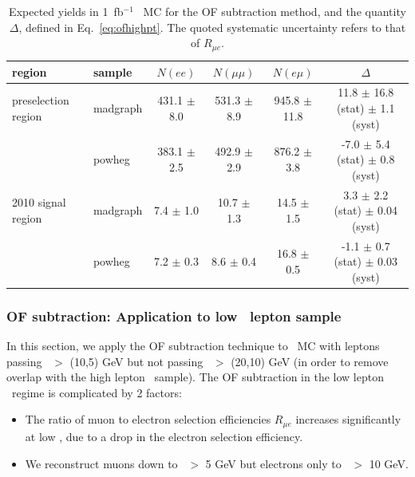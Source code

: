 \begin{table}[hbt]
\begin{center}
\caption{\label{tab:mcof} Expected yields in 1~fb$^{-1}$ \ttbar\ MC for the OF subtraction method,
and the quantity $\Delta$, defined in Eq.~\ref{eq:ofhighpt}.
The quoted systematic uncertainty refers to that of $R_{\mu e}$.
}
\begin{tabular}{llccc|c}
\hline
region                  &     sample  &       $N(ee)$     &      $N(\mu\mu)$   &     $N(e\mu)$      &         $\Delta$   \\ 
\hline

\hline

preselection region     &   madgraph  & 431.1 $\pm$ 8.0   &  531.3 $\pm$ 8.9   &  945.8 $\pm$ 11.8  &  11.8 $\pm$ 16.8 (stat) $\pm$ 1.1 (syst)   \\
                        &   powheg    & 383.1 $\pm$ 2.5   &  492.9 $\pm$ 2.9   &  876.2 $\pm$ 3.8   &  -7.0 $\pm$  5.4 (stat) $\pm$ 0.8 (syst)   \\

\hline

2010 signal region      &   madgraph  &   7.4 $\pm$ 1.0   &   10.7 $\pm$ 1.3   &   14.5 $\pm$ 1.5   &   3.3 $\pm$  2.2 (stat) $\pm$  0.04 (syst) \\
                        &   powheg    &   7.2 $\pm$ 0.3   &    8.6 $\pm$ 0.4   &   16.8 $\pm$ 0.5   &  -1.1 $\pm$  0.7 (stat) $\pm$  0.03 (syst) \\

\hline

\hline
\end{tabular}
\end{center}
\end{table}

\subsubsection{OF subtraction: Application to low \pt\ lepton sample}
\label{sec:oflowpt}

In this section, we apply the OF subtraction technique to \ttbar\ MC with
leptons passing \pt\ $>$ (10,5) GeV but not passing \pt\ $>$ (20,10) GeV
(in order to remove overlap with the high lepton \pt\ sample).
The OF subtraction in the low lepton \pt\ regime is complicated by 2 factors:

\begin{itemize}
\item The ratio of muon to electron selection efficiencies $R_{\mu e}$ increases significantly 
at low \pt, due to a drop in the electron selection efficiency.
\item We reconstruct muons down to \pt\ $>$ 5 GeV but electrons only to \pt\ $>$ 10 GeV.
\end{itemize}

